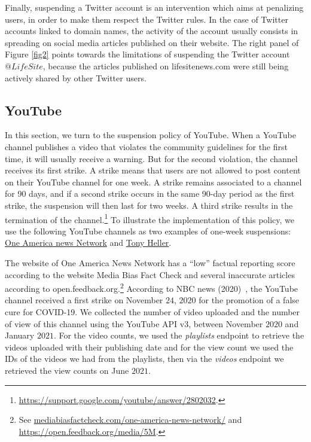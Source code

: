 \documentclass{article}
\begin{document}
Finally, suspending a Twitter account is an intervention which aims at penalizing users, in order to make them respect the Twitter rules. In the case of Twitter accounts linked to domain names, the activity of the account usually consists in spreading on social media articles published on their website. The right panel of Figure \ref{fig2} points towards the limitations of suspending the Twitter account $@LifeSite$, because the 
articles published on lifesitenews.com were still being actively shared by other Twitter users.

\subsection{YouTube}

In this section, we turn to the suspension policy of YouTube. 
When a YouTube channel publishes a video that violates the community guidelines for the first time, it will usually receive a warning. 
But for the second violation, the channel receives its first strike.
A strike means that users are not allowed to post content on their YouTube channel for one week.
A strike remains associated to a channel for 90 days, and if a second strike occurs in the same 90-day period as the first strike, the suspension will then last for two weeks.
A third strike results in the termination of the channel.\footnote{\href{https://support.google.com/youtube/answer/2802032}{https://support.google.com/youtube/answer/2802032}.}
To illustrate the implementation of this policy, we use the following YouTube channels as two examples of  one-week suspensions: \href{https://www.youtube.com/channel/UCNbIDJNNgaRrXOD7VllIMRQ}{One America news Network} and \href{https://www.youtube.com/channel/UCprclkVrNPls7PR-nHhf1Ow}{Tony Heller}.

\smallskip

The website of One America News Network has a ``low'' factual reporting score according to the website Media Bias Fact Check and several inaccurate articles according to open.feedback.org.\footnote{See \href{https://mediabiasfactcheck.com/one-america-news-network/}{mediabiasfactcheck.com/one-america-news-network/} and \href{https://open.feedback.org/media/5M}{https://open.feedback.org/media/5M}.}  
According to NBC news (2020)~\cite{nbcnews}, the YouTube channel received a first strike on November $24$, $2020$ for the promotion of a false cure for COVID-19.
We collected the number of video uploaded and the number of view of this channel using the YouTube API v3, between November $2020$ and January $2021$. For the video counts, we used the {\it playlists} endpoint to retrieve the videos uploaded with their publishing date and for the view count we used the IDs of the videos we had from the playlists, then via the {\it videos} endpoint we retrieved the view counts on June $2021$.
\end{document}
